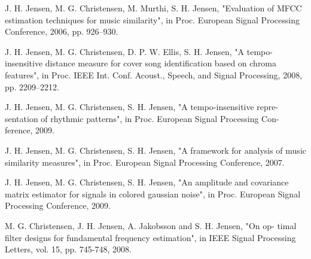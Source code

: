 \documentclass[11pt]{article}
\begin{document}
J. H. Jensen, M. G. Christensen, M. Murthi, S. H. Jensen, "Evaluation of MFCC estimation techniques for music similarity", in Proc. European Signal Processing Conference, 2006, pp. 926–930.

J. H. Jensen, M. G. Christensen, D. P. W. Ellis, S. H. Jensen, "A tempo- insensitive distance measure for cover song identification based on chroma features", in Proc. IEEE Int. Conf. Acoust., Speech, and Signal Processing, 2008, pp. 2209–2212.

J. H. Jensen, M. G. Christensen, S. H. Jensen, "A tempo-insensitive repre- sentation of rhythmic patterns", in Proc. European Signal Processing Con- ference, 2009.

J. H. Jensen, M. G. Christensen, S. H. Jensen, "A framework for analysis of music similarity measures", in Proc. European Signal Processing Conference, 2007.

J. H. Jensen, M. G. Christensen, S. H. Jensen, "An amplitude and covariance matrix estimator for signals in colored gaussian noise", in Proc. European Signal Processing Conference, 2009.

M. G. Christensen, J. H. Jensen, A. Jakobsson and S. H. Jensen, "On op- timal filter designs for fundamental frequency estimation", in IEEE Signal Processing Letters, vol. 15, pp. 745-748, 2008.
\end{document}
